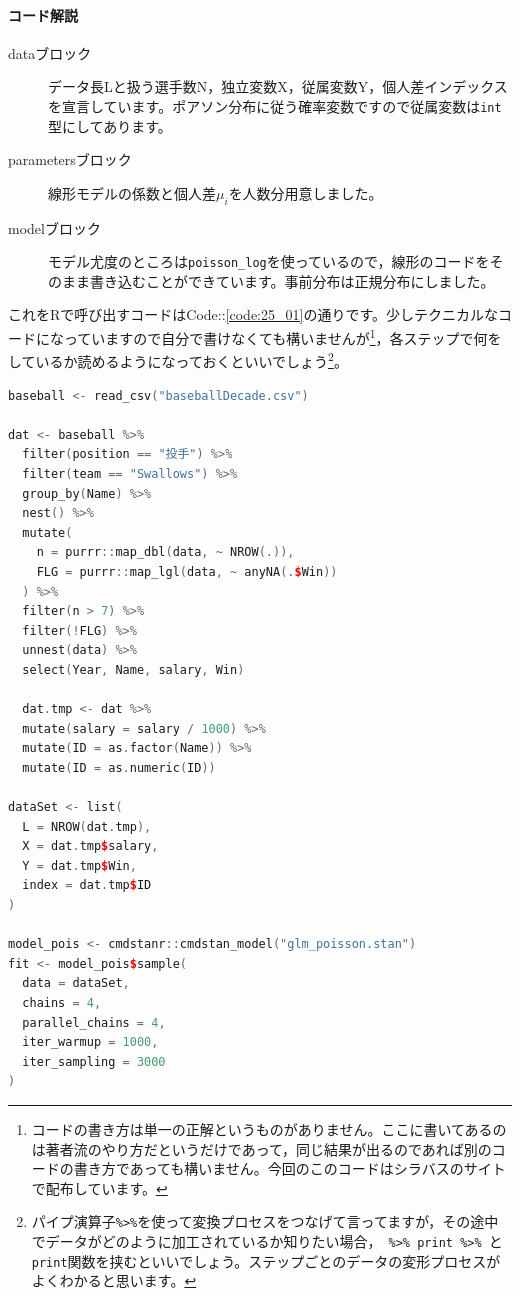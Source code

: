 \documentclass{ltjsbook}
\begin{document}
\paragraph{コード解説}
\begin{description}
	\item[dataブロック] データ長Lと扱う選手数N，独立変数X，従属変数Y，個人差インデックスを宣言しています。ポアソン分布に従う確率変数ですので従属変数は\verb|int|型にしてあります。
	\item[parametersブロック] 線形モデルの係数と個人差$\mu_i$を人数分用意しました。
	\item[modelブロック] モデル尤度のところは\verb|poisson_log|を使っているので，線形のコードをそのまま書き込むことができています。事前分布は正規分布にしました。
\end{description}

これをRで呼び出すコードはCode::\ref{code:25_01}の通りです。少しテクニカルなコードになっていますので自分で書けなくても構いませんが\footnote{コードの書き方は単一の正解というものがありません。ここに書いてあるのは著者流のやり方だというだけであって，同じ結果が出るのであれば別のコードの書き方であっても構いません。今回のこのコードはシラバスのサイトで配布しています。}，各ステップで何をしているか読めるようになっておくといいでしょう\footnote{パイプ演算子\verb|%>%|を使って変換プロセスをつなげて言ってますが，その途中でデータがどのように加工されているか知りたい場合，\verb| %>% print %>% |と\verb|print|関数を挟むといいでしょう。ステップごとのデータの変形プロセスがよくわかると思います。}。

\begin{lstlisting}[language=c++,label={code:25_01},caption={ポアソン回帰のコード}]
baseball <- read_csv("baseballDecade.csv")

dat <- baseball %>%
  filter(position == "投手") %>%
  filter(team == "Swallows") %>%
  group_by(Name) %>%
  nest() %>%
  mutate(
    n = purrr::map_dbl(data, ~ NROW(.)),
    FLG = purrr::map_lgl(data, ~ anyNA(.$Win))
  ) %>%
  filter(n > 7) %>%
  filter(!FLG) %>%
  unnest(data) %>%
  select(Year, Name, salary, Win)

  dat.tmp <- dat %>%
  mutate(salary = salary / 1000) %>%
  mutate(ID = as.factor(Name)) %>%
  mutate(ID = as.numeric(ID))

dataSet <- list(
  L = NROW(dat.tmp),
  X = dat.tmp$salary,
  Y = dat.tmp$Win,
  index = dat.tmp$ID
)

model_pois <- cmdstanr::cmdstan_model("glm_poisson.stan")
fit <- model_pois$sample(
  data = dataSet,
  chains = 4,
  parallel_chains = 4,
  iter_warmup = 1000,
  iter_sampling = 3000
)
\end{lstlisting}
\end{document}

